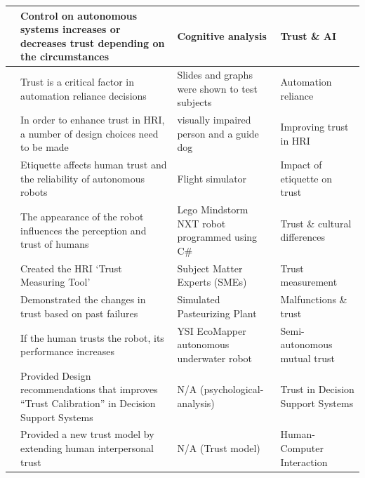 \documentclass[runningheads,a4paper]{llncs}
\begin{document}
\begin{footnotesize}
\begin{center}
\begin{tabular}{ | c | p{7cm} | p{5cm} | p{4cm} |}
		\cite{castelfranchi2000trust}
		& Control on autonomous systems increases or decreases trust depending on the circumstances
		& Cognitive analysis
		& Trust \& AI \\ \hline
		
		\cite{dzindolet2003role}
		& Trust is a critical factor in automation reliance decisions
		& Slides and graphs were shown to test subjects
		& Automation reliance \\ \hline
				
		\cite{penders2013enhancing}
    & In order to enhance trust in HRI, a number of design choices need to be made
    & visually impaired person and a guide dog
    & Improving trust in HRI \\ \hline
		
		\cite{parasuraman2004trust}
    & Etiquette affects human trust and the reliability of autonomous robots
    & Flight simulator
    & Impact of etiquette on trust \\ \hline
		
		\cite{li2010cross}
		& The appearance of the robot influences the perception and trust of humans
		& Lego Mindstorm NXT robot programmed using C\#
		& Trust \& cultural differences\\ \hline
				
		\cite{yagoda2012you}
    & Created the HRI `Trust Measuring Tool'
    & Subject Matter Experts (SMEs)                
    & Trust measurement \\ \hline
		
		\cite{itoh1999trust}
		& Demonstrated the changes in trust based on past failures
		& Simulated Pasteurizing Plant
		& Malfunctions \& trust \\ \hline
				
		\cite{wang2014human}
    & If the human trusts the robot, its performance increases
    & YSI EcoMapper autonomous underwater robot         
    & Semi-autonomous mutual trust \\ \hline
		
	  \cite{muir1987trust}
		& Provided Design recommendations that improves ``Trust Calibration'' in Decision Support Systems
		& N/A (psychological-analysis)
		& Trust in Decision Support Systems\\ \hline
		
		\cite{muir1994trust}
		& Provided a new trust model by extending human interpersonal trust
		& N/A (Trust model)
		& Human-Computer Interaction \\ \hline
		

\end{tabular}
\end{center}
\end{footnotesize}
\end{document}
